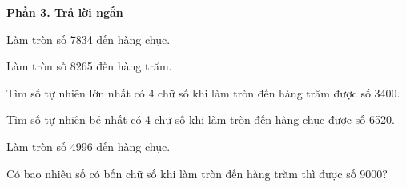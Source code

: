 \textbf{Phần 3. Trả lời ngắn}

\begin{ex} %
Làm tròn số 7834 đến hàng chục.
\end{ex}

\begin{ex} %
Làm tròn số 8265 đến hàng trăm.
\end{ex}

\begin{ex} %
Tìm số tự nhiên lớn nhất có 4 chữ số khi làm tròn đến hàng trăm được số 3400.
\end{ex}

\begin{ex} %
Tìm số tự nhiên bé nhất có 4 chữ số khi làm tròn đến hàng chục được số 6520.
\end{ex}

\begin{ex} %
Làm tròn số 4996 đến hàng chục.
\end{ex}

\begin{ex} %
Có bao nhiêu số có bốn chữ số khi làm tròn đến hàng trăm thì được số 9000?
\end{ex}
